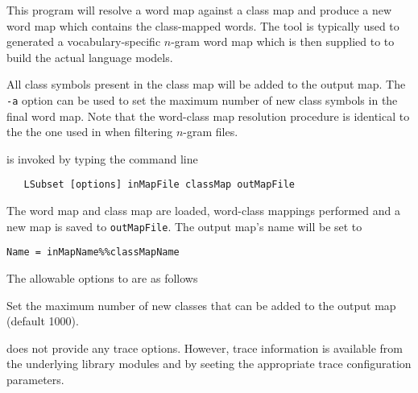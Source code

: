 %
%
%

\newpage
{}


This program will resolve a word map against a class map and produce a
new word map which contains the class-mapped words. The tool is typically
used to generated a vocabulary-specific $n$-gram word map which is then 
supplied to  to build the actual language models.

All class symbols present in the class map will be added to the output
map. The \texttt{-a} option can be used to set the maximum number of
new class symbols in the final word map. Note that the word-class map
resolution procedure is identical to the the one used in 
when filtering $n$-gram files.


 is invoked by typing the command line
\begin{verbatim}
   LSubset [options] inMapFile classMap outMapFile
\end{verbatim}
The word map and class map are loaded, word-class mappings performed and 
a new map is saved to \texttt{outMapFile}. The output map's name will be
set to 
\begin{verbatim}
Name = inMapName%%classMapName
\end{verbatim}

The allowable options to  are as follows

\begin{optlist}

    Set the maximum number of new classes that can be added 
 	to the output map (default 1000).

\end{optlist}


 does not provide any trace options. However, trace 
information is available from the underlying library modules 
 and  by seeting the appropriate trace
configuration parameters.







